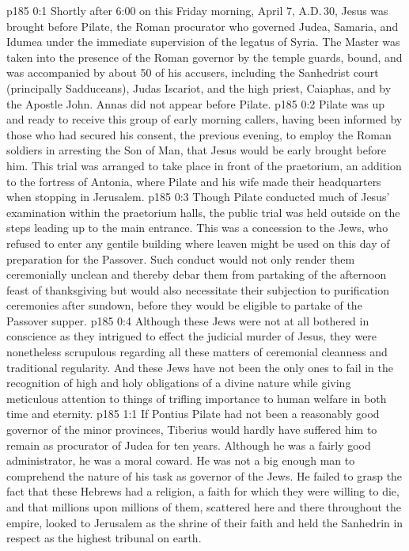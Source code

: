 \author{Midwayer Commission}
\vs p185 0:1 Shortly after 6:00 on this Friday morning, April 7, A.D.\,30, Jesus was brought before Pilate, the Roman procurator who governed Judea, Samaria, and Idumea under the immediate supervision of the legatus of Syria. The Master was taken into the presence of the Roman governor by the temple guards, bound, and was accompanied by about 50 of his accusers, including the Sanhedrist court (principally Sadduceans), Judas Iscariot, and the high priest, Caiaphas, and by the Apostle John. Annas did not appear before Pilate.
\vs p185 0:2 Pilate was up and ready to receive this group of early morning callers, having been informed by those who had secured his consent, the previous evening, to employ the Roman soldiers in arresting the Son of Man, that Jesus would be early brought before him. This trial was arranged to take place in front of the praetorium, an addition to the fortress of Antonia, where Pilate and his wife made their headquarters when stopping in Jerusalem.
\vs p185 0:3 Though Pilate conducted much of Jesus’ examination within the praetorium halls, the public trial was held outside on the steps leading up to the main entrance. This was a concession to the Jews, who refused to enter any gentile building where leaven might be used on this day of preparation for the Passover. Such conduct would not only render them ceremonially unclean and thereby debar them from partaking of the afternoon feast of thanksgiving but would also necessitate their subjection to purification ceremonies after sundown, before they would be eligible to partake of the Passover supper.
\vs p185 0:4 Although these Jews were not at all bothered in conscience as they intrigued to effect the judicial murder of Jesus, they were nonetheless scrupulous regarding all these matters of ceremonial cleanness and traditional regularity. And these Jews have not been the only ones to fail in the recognition of high and holy obligations of a divine nature while giving meticulous attention to things of trifling importance to human welfare in both time and eternity.
\vs p185 1:1 If Pontius Pilate had not been a reasonably good governor of the minor provinces, Tiberius would hardly have suffered him to remain as procurator of Judea for ten years. Although he was a fairly good administrator, he was a moral coward. He was not a big enough man to comprehend the nature of his task as governor of the Jews. He failed to grasp the fact that these Hebrews had a  religion, a faith for which they were willing to die, and that millions upon millions of them, scattered here and there throughout the empire, looked to Jerusalem as the shrine of their faith and held the Sanhedrin in respect as the highest tribunal on earth.
